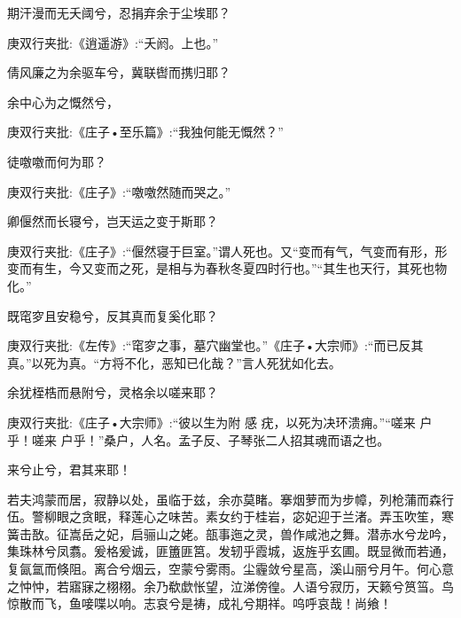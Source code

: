 \begin{qute2sp}
\begin{poem}
        \begin{pl}期汗漫而无夭阈兮，忍捐弃余于尘埃耶？\end{pl}
        \begin{note}庚双行夹批:《逍遥游》:“夭阏。上也。”\end{note}

        \begin{pl}倩风廉之为余驱车兮，冀联辔而携归耶？\end{pl}

        \begin{pl}余中心为之慨然兮，\end{pl}
        \begin{note}庚双行夹批:《庄子•至乐篇》:“我独何能无慨然？”\end{note}徒噭噭而何为耶？
        \begin{note}庚双行夹批:《庄子》:“噭噭然随而哭之。”\end{note}

        \begin{pl}卿偃然而长寝兮，岂天运之变于斯耶？\end{pl}
        \begin{note}庚双行夹批:《庄子》:“偃然寝于巨室。”谓人死也。又“变而有气，气变而有形，形变而有生，今又变而之死，是相与为春秋冬夏四时行也。”“其生也天行，其死也物化。”\end{note}

        \begin{pl}既窀穸且安稳兮，反其真而复奚化耶？\end{pl}
        \begin{note}庚双行夹批:《左传》:“窀穸之事，墓穴幽堂也。”《庄子•大宗师》:“而已反其真。”以死为真。“方将不化，恶知已化哉？”言人死犹如化去。\end{note}

        \begin{pl}余犹桎梏而悬附兮，灵格余以嗟来耶？\end{pl}
        \begin{note}庚双行夹批:《庄子•大宗师》:“彼以生为附 感 疣，以死为决环溃痈。”“嗟来 户乎！嗟来 户乎！”桑户，人名。孟子反、子琴张二人招其魂而语之也。\end{note}

        \begin{pl}来兮止兮，君其来耶！\end{pl}
    \end{poem}

    \begin{parag}
        若夫鸿蒙而居，寂静以处，虽临于兹，余亦莫睹。搴烟萝而为步幛，列枪蒲而森行伍。警柳眼之贪眠，释莲心之味苦。素女约于桂岩，宓妃迎于兰渚。弄玉吹笙，寒簧击敔。征嵩岳之妃，启骊山之姥。瓿事迤之灵，兽作咸池之舞。潜赤水兮龙吟，集珠林兮凤翥。爰格爰诚，匪簠匪筥。发轫乎霞城，返旌乎玄圃。既显微而若通，复氤氲而倏阻。离合兮烟云，空蒙兮雾雨。尘霾敛兮星高，溪山丽兮月午。何心意之忡忡，若寤寐之栩栩。余乃欷歔怅望，泣涕傍徨。人语兮寂历，天籁兮筼筜。鸟惊散而飞，鱼唼喋以响。志哀兮是祷，成礼兮期祥。呜呼哀哉！尚飨！
    \end{parag}

\end{qute2sp}

